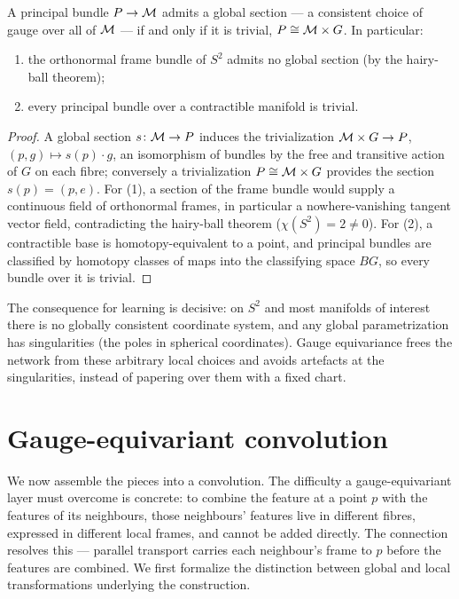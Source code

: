 \begin{proposition}
\label{prop:gauge:obstruction}
A principal bundle $P \to \mathcal{M}$ admits a global section --- a consistent choice
of gauge over all of $\mathcal{M}$ --- if and only if it is trivial,
$P \cong \mathcal{M} \times G$. In particular:
\begin{enumerate}
  \item the orthonormal frame bundle of $S^2$ admits no global section (by the
    hairy-ball theorem);
  \item every principal bundle over a contractible manifold is trivial.
\end{enumerate}
\end{proposition}

\begin{proof}
A global section $s\colon \mathcal{M} \to P$ induces the trivialization
$\mathcal{M} \times G \to P$, $(p, g) \mapsto s(p) \cdot g$, an isomorphism of bundles
by the free and transitive action of $G$ on each fibre; conversely a
trivialization $P \cong \mathcal{M} \times G$ provides the section $s(p) = (p, e)$.
For (1), a section of the frame bundle would supply a continuous field of
orthonormal frames, in particular a nowhere-vanishing tangent vector field,
contradicting the hairy-ball theorem ($\chi(S^2) = 2 \neq 0$). For (2), a
contractible base is homotopy-equivalent to a point, and principal bundles are
classified by homotopy classes of maps into the classifying space $BG$, so every
bundle over it is trivial.
\end{proof}

The consequence for learning is decisive: on $S^2$ and most manifolds of
interest there is no globally consistent coordinate system, and any global
parametrization has singularities (the poles in spherical coordinates). Gauge
equivariance frees the network from these arbitrary local choices and avoids
artefacts at the singularities, instead of papering over them with a fixed
chart.

\section{Gauge-equivariant convolution}
\label{sec:gauge:conv}

We now assemble the pieces into a convolution. The difficulty a gauge-equivariant
layer must overcome is concrete: to combine the feature at a point $p$ with the
features of its neighbours, those neighbours' features live in different fibres,
expressed in different local frames, and cannot be added directly. The
connection resolves this --- parallel transport carries each neighbour's frame
to $p$ before the features are combined. We first formalize the distinction
between global and local transformations underlying the construction.

